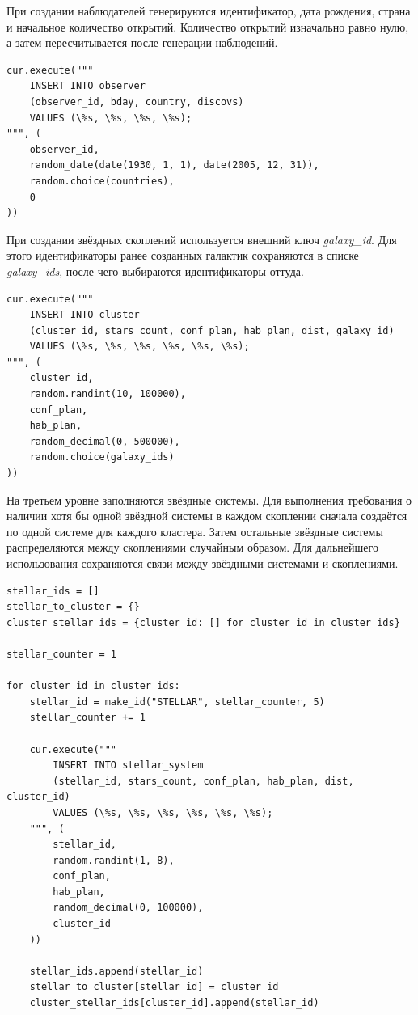 \documentclass[14pt,a4paper]{extarticle}
\begin{document}
При создании наблюдателей генерируются идентификатор, дата рождения, страна и начальное количество открытий. Количество открытий изначально равно нулю, а затем пересчитывается после генерации наблюдений.

\begin{lstlisting}[caption={Вставка наблюдателя}]
cur.execute("""
    INSERT INTO observer
    (observer_id, bday, country, discovs)
    VALUES (\%s, \%s, \%s, \%s);
""", (
    observer_id,
    random_date(date(1930, 1, 1), date(2005, 12, 31)),
    random.choice(countries),
    0
))
\end{lstlisting}

При создании звёздных скоплений используется внешний ключ \textit{galaxy\_id}. Для этого идентификаторы ранее созданных галактик сохраняются в списке \textit{galaxy\_ids}, после чего выбираются идентификаторы оттуда.

\begin{lstlisting}[caption={Вставка звёздного скопления}]
cur.execute("""
    INSERT INTO cluster
    (cluster_id, stars_count, conf_plan, hab_plan, dist, galaxy_id)
    VALUES (\%s, \%s, \%s, \%s, \%s, \%s);
""", (
    cluster_id,
    random.randint(10, 100000),
    conf_plan,
    hab_plan,
    random_decimal(0, 500000),
    random.choice(galaxy_ids)
))
\end{lstlisting}

На третьем уровне заполняются звёздные системы. Для выполнения требования о наличии хотя бы одной звёздной системы в каждом скоплении сначала создаётся по одной системе для каждого кластера. Затем остальные звёздные системы распределяются между скоплениями случайным образом. Для дальнейшего использования сохраняются связи между звёздными системами и скоплениями.

\begin{lstlisting}[caption={Вставка звёздных систем}]
stellar_ids = []
stellar_to_cluster = {}
cluster_stellar_ids = {cluster_id: [] for cluster_id in cluster_ids}

stellar_counter = 1

for cluster_id in cluster_ids:
    stellar_id = make_id("STELLAR", stellar_counter, 5)
    stellar_counter += 1

    cur.execute("""
        INSERT INTO stellar_system
        (stellar_id, stars_count, conf_plan, hab_plan, dist, cluster_id)
        VALUES (\%s, \%s, \%s, \%s, \%s, \%s);
    """, (
        stellar_id,
        random.randint(1, 8),
        conf_plan,
        hab_plan,
        random_decimal(0, 100000),
        cluster_id
    ))

    stellar_ids.append(stellar_id)
    stellar_to_cluster[stellar_id] = cluster_id
    cluster_stellar_ids[cluster_id].append(stellar_id)
\end{lstlisting}
\end{document}
